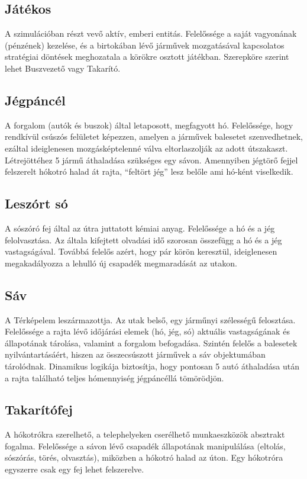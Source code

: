 \subsection{Játékos}
\par{A szimulációban részt vevő aktív, emberi entitás. Felelőssége a saját vagyonának (pénzének) kezelése, és a birtokában lévő járművek mozgatásával kapcsolatos stratégiai döntések meghozatala a körökre osztott játékban. Szerepköre szerint lehet Buszvezető vagy Takarító.}

\subsection{Jégpáncél}
\par{A forgalom (autók és buszok) által letaposott, megfagyott hó. Felelőssége, hogy rendkívül csúszós felületet képezzen, amelyen a járművek balesetet szenvedhetnek, ezáltal ideiglenesen mozgásképtelenné válva eltorlaszolják az adott útszakaszt. Létrejöttéhez 5 jármű áthaladása szükséges egy sávon. Amennyiben jégtörő fejjel felszerelt hókotró halad át rajta, “feltört jég” lesz belőle ami hó-ként viselkedik.}

\subsection{Leszórt só}
\par{A sószóró fej által az útra juttatott kémiai anyag. Felelőssége a hó és a jég felolvasztása. Az általa kifejtett olvadási idő szorosan összefügg a hó és a jég vastagságával. Továbbá felelős azért, hogy pár körön keresztül, ideiglenesen megakadályozza a lehulló új csapadék megmaradását az utakon.}

\subsection{Sáv}
\par{A Térképelem leszármazottja. Az utak belső, egy járműnyi szélességű felosztása. Felelőssége a rajta lévő időjárási elemek (hó, jég, só) aktuális vastagságának és állapotának tárolása, valamint a forgalom befogadása. Szintén felelős a balesetek nyilvántartásáért, hiszen az összecsúszott járművek a sáv objektumában tárolódnak. Dinamikus logikája biztosítja, hogy pontosan 5 autó áthaladása után a rajta található teljes hómennyiség jégpáncéllá tömörödjön.}

\subsection{Takarítófej}
\par{A hókotrókra szerelhető, a telephelyeken cserélhető munkaeszközök absztrakt fogalma. Felelőssége a sávon lévő csapadék állapotának manipulálása (eltolás, sószórás, törés, olvasztás), miközben a hókotró halad az úton. Egy hókotróra egyszerre csak egy fej lehet felszerelve.}

